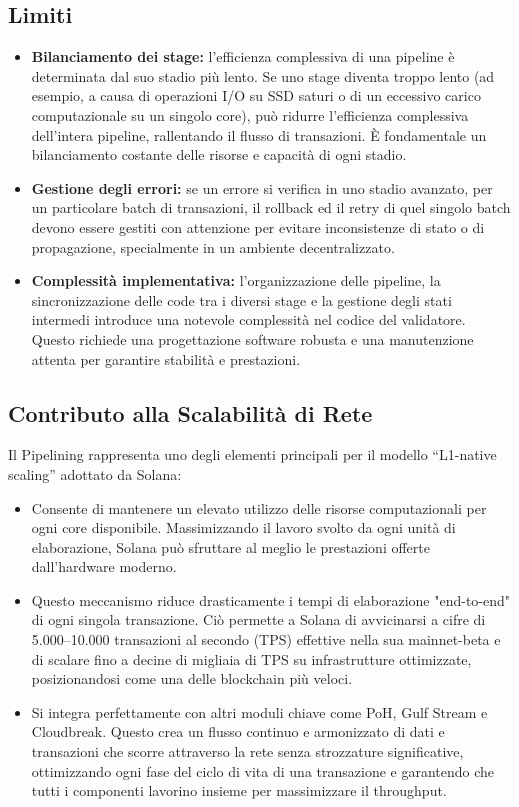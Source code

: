 \documentclass[a4paper,12pt]{report}
\begin{document}
	\subsection{Limiti}
	\begin{itemize}
		\item \textbf{Bilanciamento dei stage:} l'efficienza complessiva di una pipeline è determinata dal suo stadio più lento. Se uno stage diventa troppo lento (ad esempio, a causa di operazioni I/O su SSD saturi o di un eccessivo carico computazionale su un singolo core), può ridurre l'efficienza complessiva dell'intera pipeline, rallentando il flusso di transazioni. È fondamentale un bilanciamento costante delle risorse e capacità di ogni stadio.
		\item \textbf{Gestione degli errori:} se un errore si verifica in uno stadio avanzato, per un particolare batch di transazioni, il rollback ed il retry di quel singolo batch devono essere gestiti con attenzione per evitare inconsistenze di stato o di propagazione, specialmente in un ambiente decentralizzato.
		\item \textbf{Complessità implementativa:} l'organizzazione delle pipeline, la sincronizzazione delle code tra i diversi stage e la gestione degli stati intermedi introduce una notevole complessità nel codice del validatore. Questo richiede una progettazione software robusta e una manutenzione attenta per garantire stabilità e prestazioni.
	\end{itemize}
	
	\subsection{Contributo alla Scalabilità di Rete}
	Il Pipelining rappresenta uno degli elementi principali per il modello “L1-native scaling” adottato da Solana:  
	\begin{itemize}
		\item Consente di mantenere un elevato utilizzo delle risorse computazionali per ogni core disponibile. Massimizzando il lavoro svolto da ogni unità di elaborazione, Solana può sfruttare al meglio le prestazioni offerte dall'hardware moderno.
		\item Questo meccanismo riduce drasticamente i tempi di elaborazione "end-to-end" di ogni singola transazione. Ciò permette a Solana di avvicinarsi a cifre di 5.000–10.000 transazioni al secondo (TPS) effettive nella sua mainnet-beta e di scalare fino a decine di migliaia di TPS su infrastrutture ottimizzate, posizionandosi come una delle blockchain più veloci.
		\item Si integra perfettamente con altri moduli chiave come PoH, Gulf Stream e Cloudbreak. Questo crea un flusso continuo e armonizzato di dati e transazioni che scorre attraverso la rete senza strozzature significative, ottimizzando ogni fase del ciclo di vita di una transazione e garantendo che tutti i componenti lavorino insieme per massimizzare il throughput.
	\end{itemize}
	
\end{document}
